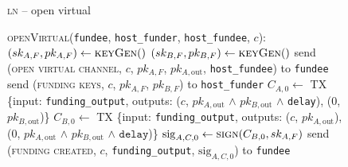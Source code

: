 \begin{figure}[H]
  \begin{processbox}{\textsc{ln} -- open virtual}
    \begin{algorithmic}[1]
      \State \textsc{openVirtual}(\texttt{fundee}, \texttt{host\_funder},
      \texttt{host\_fundee}, $c$):
      \Indent
        \State $(sk_{A, F}, pk_{A, F}) \gets \textsc{keyGen}()$
          \State $(sk_{B, F}, pk_{B, F}) \gets \textsc{keyGen}()$
        \Else \: 
          \State send (\textsc{open virtual channel}, $c$, $pk_{A, F}$, $pk_{A,
          \mathrm{out}}$, \texttt{host\_fundee}) to \texttt{fundee}
          \State {}
          \State {}
          \State {}
          \State {}
          \State {}
        \EndIf
        \State send (\textsc{funding keys}, $c$, $pk_{A, F}$, $pk_{B, F}$) to
        \texttt{host\_funder}
        \State {} 
        \State {}
          \State $C_{A, 0} \gets$ TX \{input: \texttt{funding\_output}, outputs:
          ($c$, $pk_{A, \mathrm{out}}$ $\wedge$ $pk_{B, \mathrm{out}}$ $\wedge$
          \texttt{delay}), ($0$, $pk_{B, \mathrm{out}}$)\}
          \State $C_{B, 0} \gets$ TX \{input: \texttt{funding\_output}, outputs:
          ($c$, $pk_{A, \mathrm{out}}$), ($0$, $pk_{A, \mathrm{out}}$ $\wedge$
          $pk_{B, \mathrm{out}}$ $\wedge$ $\texttt{delay}$)\}
          \State $\mathrm{sig}_{A, C, 0} \gets \textsc{sign}(C_{B, 0}, sk_{A,
          F})$
          \State send (\textsc{funding created}, $c$, \texttt{funding\_output},
          $\mathrm{sig}_{A, C, 0}$) to \texttt{fundee}
          \State {}
          \State {}
\end{algorithmic}
\end{processbox}
\end{figure}
